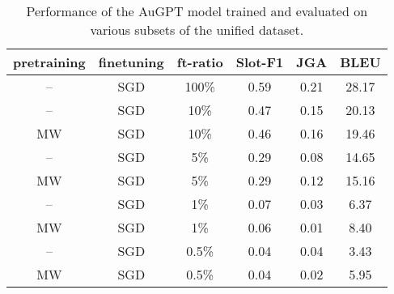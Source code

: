 \begin{table*}[tp]
    \centering \small
    \begin{tabular}{cccccc}
      \toprule
       pretraining & finetuning & ft-ratio & \textbf{Slot-F1} & \textbf{JGA} & \textbf{BLEU} \\
        \midrule
       -- & SGD & 100\% & 0.59 & 0.21 & 28.17 \\
       -- & SGD & 10\% & 0.47 & 0.15 & 20.13 \\
       MW & SGD & 10\% & 0.46 & 0.16 & 19.46 \\
       -- & SGD & 5\% & 0.29 & 0.08 & 14.65 \\
       MW & SGD & 5\% & 0.29 & 0.12 & 15.16 \\
       -- & SGD & 1\% & 0.07 & 0.03 & 6.37\\
       MW & SGD & 1\% & 0.06 & 0.01 & 8.40 \\
       -- & SGD & 0.5\% & 0.04 & 0.04 & 3.43 \\
       MW & SGD & 0.5\% & 0.04 & 0.02 & 5.95 \\
       \midrule
      \bottomrule
  \end{tabular}
  \caption{Performance of the AuGPT model trained and evaluated on various subsets of the unified dataset.}
  \label{tab:exp-results-seed}
\end{table*}